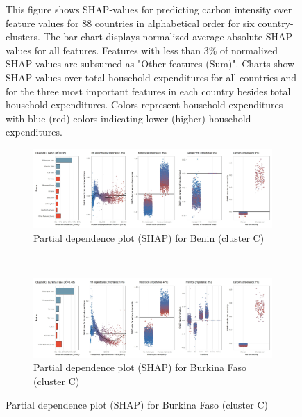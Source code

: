 \begin{figure}[ht!]
    \begin{subcaption2}
     This figure shows SHAP-values for predicting carbon intensity over feature values for 88 countries in alphabetical order for six country-clusters. The bar chart displays normalized average absolute SHAP-values for all features. Features with less than 3\% of normalized SHAP-values are subsumed as "Other features (Sum)". Charts show SHAP-values over total household expenditures for all countries and for the three most important features in each country besides total household expenditures. Colors represent household expenditures with blue (red) colors indicating lower (higher) household expenditures.
     \end{subcaption2}
\end{figure}

\begin{figure}[ht!]\ContinuedFloat
    \centering
   \begin{subfigure}[b]{\textwidth}
   \centering
         \caption{Partial dependence plot (SHAP) for Benin (cluster C)}
         \label{fig:5b_BEN}
         \includegraphics[width=\textwidth]{Figure 5b/Figure_5b_BEN}
         \end{subfigure}
    \\
    \vspace{0.5cm}
    \begin{subfigure}[b]{\textwidth}
   \centering
         \caption{Partial dependence plot (SHAP) for Burkina Faso (cluster C)}
         \label{fig:5b_BFA}
         \includegraphics[width=\textwidth]{Figure 5b/Figure_5b_BFA}  
         \end{subfigure}

\end{figure}
